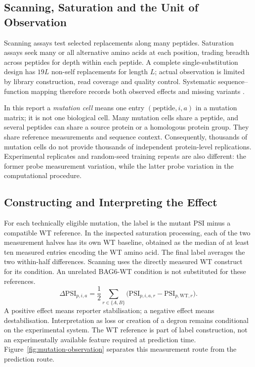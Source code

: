 \subsection{Scanning, Saturation and the Unit of Observation}
Scanning assays test selected replacements along many peptides. Saturation assays seek many or
all alternative amino acids at each position, trading breadth across peptides for depth within each
peptide. A complete single-substitution design has $19L$ non-self replacements for length $L$;
actual observation is limited by library construction, read coverage and quality control. Systematic
sequence--function mapping therefore records both observed effects and missing variants
\citep{fowler2010}.

In this report a \emph{mutation cell} means one entry $(\text{peptide},i,a)$ in a mutation matrix; it is
not one biological cell. Many mutation cells share a peptide, and several peptides can share a source
protein or a homologous protein group. They share reference measurements and sequence context.
Consequently, thousands of mutation cells do not provide thousands of independent protein-level
replications. Experimental replicates and random-seed training repeats are also different: the former
probe measurement variation, while the latter probe variation in the computational procedure.

\subsection{Constructing and Interpreting the Effect}
For each technically eligible mutation, the label is the mutant PSI minus a compatible WT reference.
In the inspected saturation processing, each of the two measurement halves has its own WT baseline,
obtained as the median of at least ten measured entries encoding the WT amino acid. The final label
averages the two within-half differences. Scanning uses the directly measured WT construct for its
condition. An unrelated BAG6-WT condition is not substituted for these references.
\begin{equation}
 \Delta\mathrm{PSI}_{p,i,a}
 =\frac{1}{2}\sum_{r\in\{A,B\}}
       \bigl(\mathrm{PSI}_{p,i,a,r}-\mathrm{PSI}_{p,\mathrm{WT},r}\bigr).
 \label{eq:delta-psi-halves}
\end{equation}
A positive effect means reporter stabilisation; a negative effect means destabilisation. Interpretation
as loss or creation of a degron remains conditional on the experimental system. The WT reference is
part of label construction, not an experimentally available feature required at prediction time.
Figure~\ref{fig:mutation-observation} separates this measurement route from the prediction route.

